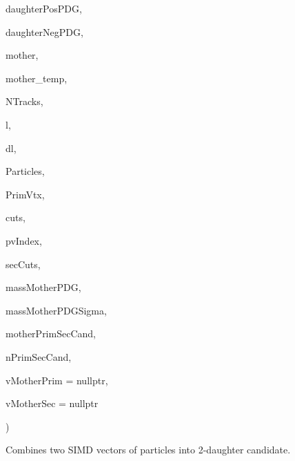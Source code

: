 {\begin{DoxyParamCaption}
\item[{int\+\_\+v \&}]{daughter\+Pos\+P\+DG, }
\item[{int\+\_\+v \&}]{daughter\+Neg\+P\+DG, }
\item[{{\bf K\+F\+Particle\+S\+I\+MD} \&}]{mother, }
\item[{{\bf K\+F\+Particle} \&}]{mother\+\_\+temp, }
\item[{unsigned short}]{N\+Tracks, }
\item[{kfvector\+\_\+floatv \&}]{l, }
\item[{kfvector\+\_\+floatv \&}]{dl, }
\item[{std\+::vector$<$ {\bf K\+F\+Particle} $>$ \&}]{Particles, }
\item[{std\+::vector$<$ {\bf K\+F\+Particle\+S\+I\+MD}, {\bf K\+F\+P\+Simd\+Allocator}$<$ {\bf K\+F\+Particle\+S\+I\+MD} $>$ $>$ \&}]{Prim\+Vtx, }
\item[{const float $\ast$}]{cuts, }
\item[{const int\+\_\+v \&}]{pv\+Index, }
\item[{const float $\ast$}]{sec\+Cuts, }
\item[{const float\+\_\+v \&}]{mass\+Mother\+P\+DG, }
\item[{const float\+\_\+v \&}]{mass\+Mother\+P\+D\+G\+Sigma, }
\item[{{\bf K\+F\+Particle\+S\+I\+MD} \&}]{mother\+Prim\+Sec\+Cand, }
\item[{int \&}]{n\+Prim\+Sec\+Cand, }
\item[{std\+::vector$<$ std\+::vector$<$ {\bf K\+F\+Particle} $>$ $>$ $\ast$}]{v\+Mother\+Prim = {\ttfamily nullptr}, }
\item[{std\+::vector$<$ {\bf K\+F\+Particle} $>$ $\ast$}]{v\+Mother\+Sec = {\ttfamily nullptr}}
\end{DoxyParamCaption}
)\hspace{0.3cm}{\ttfamily [inline]}}\hypertarget{classKFParticleFinder_a2346e637d92eae212091abd37919403e}{}\label{classKFParticleFinder_a2346e637d92eae212091abd37919403e}
Combines two S\+I\+MD vectors of particles into 2-\/daughter candidate. 
